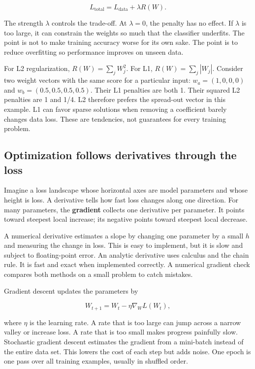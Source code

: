 \[L_{\text{total}}=L_{\text{data}}+\lambda R(W).\]

The strength \(\lambda\) controls the trade-off. At \(\lambda=0\), the penalty has no effect. If \(\lambda\) is too large, it can constrain the weights so much that the classifier underfits. The point is not to make training accuracy worse for its own sake. The point is to reduce overfitting so performance improves on unseen data.

For L2 regularization, \(R(W)=\sum_j W_j^2\). For L1, \(R(W)=\sum_j|W_j|\). Consider two weight vectors with the same score for a particular input: \(w_a=(1,0,0,0)\) and \(w_b=(0.5,0.5,0.5,0.5)\). Their L1 penalties are both 1. Their squared L2 penalties are 1 and 1/4. L2 therefore prefers the spread-out vector in this example. L1 can favor sparse solutions when removing a coefficient barely changes data loss. These are tendencies, not guarantees for every training problem.

\subsection{Optimization follows derivatives through the loss}\label{04-visual-computing-ii-ch031-optimization-follows-derivatives-through-the-loss}

\hypertarget{04-visual-computing-ii-ch031-optimization-follows-derivatives-through-the-loss}{}

Imagine a loss landscape whose horizontal axes are model parameters and whose height is loss. A derivative tells how fast loss changes along one direction. For many parameters, the \textbf{gradient} collects one derivative per parameter. It points toward steepest local increase; its negative points toward steepest local decrease.

A numerical derivative estimates a slope by changing one parameter by a small \(h\) and measuring the change in loss. This is easy to implement, but it is slow and subject to floating-point error. An analytic derivative uses calculus and the chain rule. It is fast and exact when implemented correctly. A numerical gradient check compares both methods on a small problem to catch mistakes.

Gradient descent updates the parameters by

\[W_{t+1}=W_t-\eta\nabla_W L(W_t),\]

where \(\eta\) is the learning rate. A rate that is too large can jump across a narrow valley or increase loss. A rate that is too small makes progress painfully slow. Stochastic gradient descent estimates the gradient from a mini-batch instead of the entire data set. This lowers the cost of each step but adds noise. One epoch is one pass over all training examples, usually in shuffled order.

